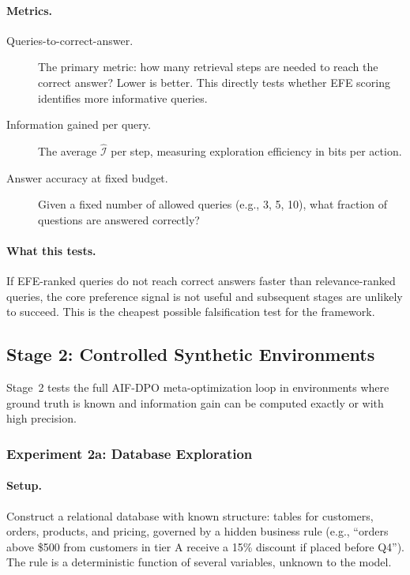 \documentclass[11pt]{article}
\begin{document}
\paragraph{Metrics.}
\begin{description}
    \item[Queries-to-correct-answer.] The primary metric: how many retrieval steps are needed to reach the correct answer? Lower is better. This directly tests whether EFE scoring identifies more informative queries.
    \item[Information gained per query.] The average $\hat{\mathcal{I}}$ per step, measuring exploration efficiency in bits per action.
    \item[Answer accuracy at fixed budget.] Given a fixed number of allowed queries (e.g., 3, 5, 10), what fraction of questions are answered correctly?
\end{description}

\paragraph{What this tests.}
If EFE-ranked queries do not reach correct answers faster than relevance-ranked queries, the core preference signal is not useful and subsequent stages are unlikely to succeed. This is the cheapest possible falsification test for the framework.


\subsection{Stage 2: Controlled Synthetic Environments}
\label{sec:exp-stage2}

Stage~2 tests the full AIF-DPO meta-optimization loop in environments where ground truth is known and information gain can be computed exactly or with high precision.


\subsubsection{Experiment 2a: Database Exploration}
\label{sec:exp-db}

\paragraph{Setup.}
Construct a relational database with known structure: tables for customers, orders, products, and pricing, governed by a hidden business rule (e.g., ``orders above \$500 from customers in tier A receive a 15\% discount if placed before Q4''). The rule is a deterministic function of several variables, unknown to the model.
\end{document}
